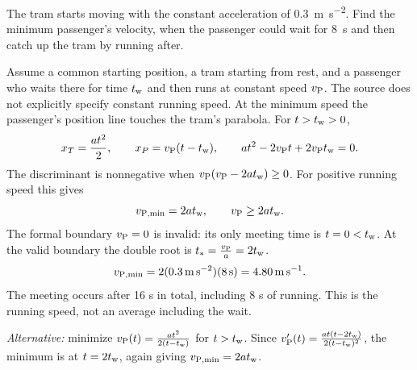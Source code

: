 \quiznextproblem
\begin{problem}[25 pts]
The tram starts moving with the constant acceleration of
\qty{0.3}{\metre\per\second\squared}. Find the minimum passenger's velocity,
when the passenger could wait for \qty{8}{\second} and then catch up the
tram by running after.
\end{problem}
\begin{solution}
Assume a common starting position, a tram starting from rest, and a
passenger who waits there for time $t_{\rm w}$ and then runs at constant speed $v_{\rm P}$.
The source does not explicitly specify constant running speed.
At the minimum speed the passenger's position line touches the tram's parabola.
For $t>t_{\rm w}>0$,
\[
x_T=\frac{at^2}{2},\qquad x_P=v_{\rm P}(t-t_{\rm w}),\qquad
at^2-2v_{\rm P}t+2v_{\rm P}t_{\rm w}=0.
\]
The discriminant is nonnegative when $v_{\rm P}(v_{\rm P}-2at_{\rm w})\geq0$.
For positive running speed this gives
\[
v_{\rm P,min}=2at_{\rm w},\qquad v_{\rm P}\geq2at_{\rm w}.
\]
The formal boundary $v_{\rm P}=0$ is invalid: its only meeting time is $t=0<t_{\rm w}$.
At the valid boundary the double root is $t_*=\frac{v_{\rm P}}{a}=2t_{\rm w}$.
\[
v_{\rm P,min}=2(\qty{0.3}{\metre\per\second\squared})(\qty{8}{\second})
=\qty{4.80}{\metre\per\second}.
\]
The meeting occurs after 16 s in total, including 8 s of running.
This is the running speed, not an average including the wait.

\textit{Alternative:} minimize
$v_{\rm P}(t)=\frac{at^2}{2(t-t_{\rm w})}$ for $t>t_{\rm w}$.
Since $v_{\rm P}'(t)=\frac{at(t-2t_{\rm w})}{2(t-t_{\rm w})^2}$, the minimum is at
$t=2t_{\rm w}$, again giving $v_{\rm P,min}=2at_{\rm w}$.
\end{solution}

